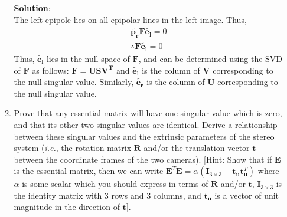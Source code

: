 \documentclass[11pt]{article}
\begin{document}
\begin{enumerate}
\begin{enumerate}
\textbf{Solution}:\\
The left epipole lies on all epipolar lines in the left image. Thus,
\begin{align*}
\mathbf{\tilde{p_r}}\mathbf{F}\mathbf{\tilde{e_l}} = 0 \\
\therefore \mathbf{F}\mathbf{\tilde{e_l}} = 0
\end{align*}
Thus, $\mathbf{\tilde{e_l}}$ lies in the null space of $\mathbf{F}$, and can be determined using the SVD of $\mathbf{F}$ as follows: $\mathbf{F} = \mathbf{U}\mathbf{S}\mathbf{V^T}$ and $\mathbf{\tilde{e_l}}$ is the column of $\mathbf{V}$ corresponding to the null singular value. Similarly, $\mathbf{\tilde{e_r}}$ is the column of $\mathbf{U}$ corresponding to the null singular value.
\item Prove that any essential matrix will have one singular value which is zero, and that its other two singular values are identical. Derive a relationship between these singular values and the extrinsic parameters of the stereo system (\textit{i.e.}, the rotation matrix $\textbf{R}$ and/or the translation vector $\textbf{t}$ between the coordinate frames of the two cameras). [Hint: Show that if $\textbf{E}$ is the essential matrix, then we can write $\textbf{E}^T \textbf{E} = \alpha (\textbf{I}_{3 \times 3} - \textbf{t}_\textbf{u} \textbf{t}^T_\textbf{u})$ where $\alpha$ is some scalar which you should express in terms of $\textbf{R}$ and/or $\textbf{t}$, $\textbf{I}_{3 \times 3}$  is the identity matrix with 3 rows and 3 columns, and $\textbf{t}_\textbf{u}$ is a vector of unit magnitude in the direction of $\textbf{t}$]. \\


\end{enumerate}
\end{enumerate}
\end{document}
